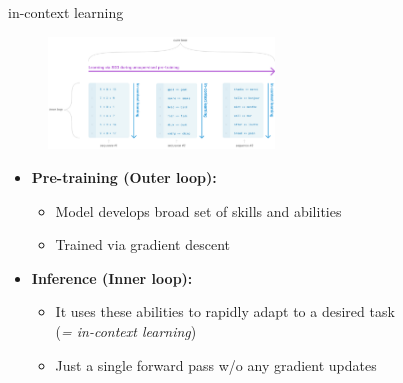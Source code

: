 
\begin{frame}{in-context learning}

\vfill

\begin{figure}
		\centering
		\includegraphics[width = 6cm]{figure/twotypesoflearning.png}\\
\end{figure}

\begin{itemize}
	\item \textbf{Pre-training (Outer loop):}
			\begin{itemize}
				\item Model develops broad set of skills and abilities
				\item Trained via gradient descent
			\end{itemize}
	\item \textbf{Inference (Inner loop):}
			\begin{itemize}
				\item It uses these abilities to rapidly adapt to a desired task\\(\textit{= in-context learning})
				\item Just a single forward pass w/o any gradient updates
			\end{itemize}
\end{itemize}

\vfill

\end{frame}


